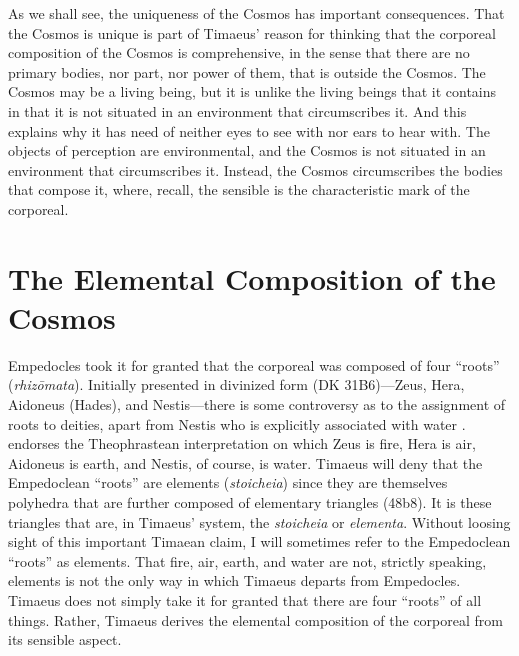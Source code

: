 As we shall see, the uniqueness of the Cosmos has important consequences. That the Cosmos is unique is part of Timaeus' reason for thinking that the corporeal composition of the Cosmos is comprehensive, in the sense that there are no primary bodies, nor part, nor power of them, that is outside the Cosmos. The Cosmos may be a living being, but it is unlike the living beings that it contains in that it is not situated in an environment that circumscribes it. And this explains why it has need of neither eyes to see with nor ears to hear with. The objects of perception are environmental, and the Cosmos is not situated in an environment that circumscribes it. Instead, the Cosmos circumscribes the bodies that compose it, where, recall, the sensible is the characteristic mark of the corporeal.



\section{The Elemental Composition of the Cosmos} %
\label{sec:the_elemental_composition_of_the_corporeal}

Empedocles took it for granted that the corporeal was composed of four ``roots'' (\emph{rhi\-zō\-ma\-ta}). Initially presented in divinized form (DK 31B6)---Zeus, Hera, Aidoneus (Hades), and Nestis---there is some controversy as to the assignment of roots to deities, apart from Nestis who is explicitly associated with water \citep[165--6]{Wright:1981zr}. \citet[165]{Wright:1981zr} endorses the Theophrastean interpretation on which Zeus is fire, Hera is air, Aidon\-eus is earth, and Nestis, of course, is water. Timaeus will deny that the Empedoclean ``roots'' are elements (\emph{stoicheia}) since they are themselves polyhedra that are further composed of elementary triangles (48b8). It is these triangles that are, in Timaeus' system, the \emph{stoicheia} or \emph{elementa}. Without loosing sight of this important Timaean claim, I will sometimes refer to the Empedoclean ``roots'' as elements. That fire, air, earth, and water are not, strictly speaking, elements is not the only way in which Timaeus departs from Empedocles. Timaeus does not simply take it for granted that there are four ``roots'' of all things. Rather, Timaeus derives the elemental composition of the corporeal from its sensible aspect.

